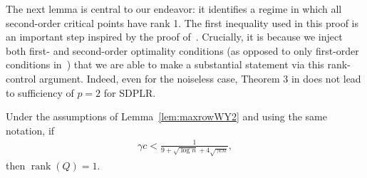 \documentclass{colt2016} %
\newcommand{\rank}{\operatorname{rank}}
\newcommand{\1}{\mathbf{1}}
\begin{document}
The next lemma is central to our endeavor: it identifies a regime in which all second-order critical points have rank 1. The first inequality used in this proof is an important step inspired by the proof of~\citep[Thm.~3]{wen2013orthogonality}. Crucially, it is because we inject both first- and second-order optimality conditions (as opposed to only first-order conditions in~\citep{wen2013orthogonality}) that we are able to make a substantial statement via this rank-control argument. Indeed, even for the noiseless case, Theorem 3 in \citep{wen2013orthogonality} does not lead to sufficiency of $p=2$ for SDPLR.
\begin{lemma} \label{lem:master}
	Under the assumptions of Lemma~\ref{lem:maxrowWY2} and using the same notation, if
	\begin{align*}
		\gamma c < \frac{1}{9 + \sqrt{\log n} + 4\sqrt{\gamma c n}},
	\end{align*}
	then $\rank(Q) = 1$.
\end{lemma}
\end{document}
